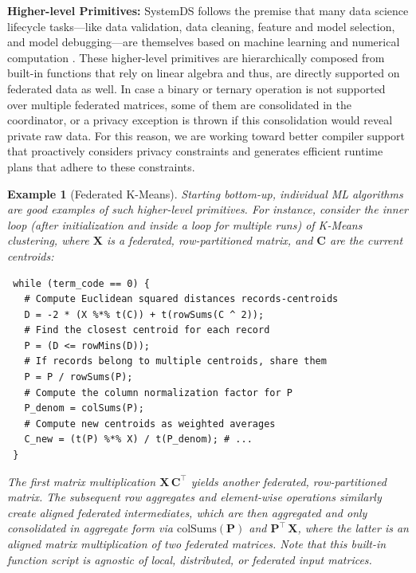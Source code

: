 \documentclass[sigconf,screen]{acmart}
\newcommand{\mat}[1]{\ensuremath{\mathbf{#1}}}
\newtheorem{example}{Example}
\begin{document}
\textbf{Higher-level Primitives:} SystemDS follows the premise that many data science lifecycle tasks---like data validation, data cleaning, feature and model selection, and model debugging---are themselves based on machine learning and numerical computation \cite{BoehmADGIKLPR20}. These higher-level primitives are hierarchically composed from built-in functions that rely on linear algebra and thus, are directly supported on federated data as well. In case a binary or ternary operation is not supported over multiple federated matrices, some of them are consolidated in the coordinator, or a privacy exception is thrown if this consolidation would reveal private raw data. For this reason, we are working toward better compiler support that proactively considers privacy constraints and generates efficient runtime plans that adhere to these constraints. 

\begin{example}[Federated K-Means] \label{ex:kmeans}
Starting bottom-up, individual ML algorithms are good examples of such higher-level primitives. For instance, consider the inner loop (after initialization and inside a loop for multiple runs) of K-Means clustering, where $\mat{X}$ is a federated, row-partitioned matrix, and $\mat{C}$ are the current centroids:

\small \vspace{0.1cm}
\begin{verbatim}
 while (term_code == 0) {
   # Compute Euclidean squared distances records-centroids   
   D = -2 * (X %*% t(C)) + t(rowSums(C ^ 2));
   # Find the closest centroid for each record
   P = (D <= rowMins(D));
   # If records belong to multiple centroids, share them
   P = P / rowSums(P);
   # Compute the column normalization factor for P
   P_denom = colSums(P);
   # Compute new centroids as weighted averages
   C_new = (t(P) %*% X) / t(P_denom); # ...
 }
\end{verbatim}
\normalsize \vspace{0.1cm}

\noindent The first matrix multiplication $\mat{X}\, \mat{C}^{\top}$ yields another federated, row-partitioned matrix. The subsequent row aggregates and element-wise operations similarly create aligned federated intermediates, which are then aggregated and only consolidated in aggregate form via $\text{colSums}(\mat{P})$ and $\mat{P}^{\top}\, \mat{X}$, where the latter is an aligned matrix multiplication of two federated matrices. Note that this built-in function script is agnostic of local, distributed, or federated input matrices.
\end{example}
\end{document}
